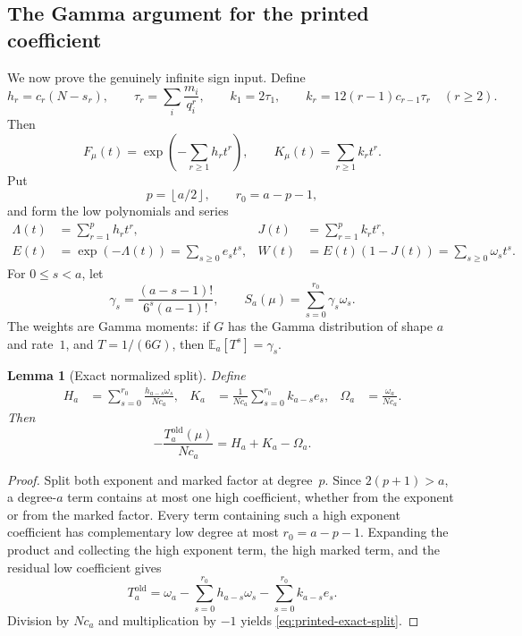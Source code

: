 \documentclass[11pt]{article}
\newtheorem{lemma}[theorem]{Lemma}
\theoremstyle{definition}
\theoremstyle{remark}
\newcommand{\floor}[1]{\left\lfloor #1\right\rfloor}
\begin{document}
\subsection{The Gamma argument for the printed coefficient}
\label{subsec:gamma52}

We now prove the genuinely infinite sign input.  Define
\begin{equation}\label{eq:hk52}
 h_r=c_r(N-s_r),
 \qquad
 \tau_r=\sum_i\frac{m_i}{q_i^r},
 \qquad
 k_1=2\tau_1,
 \qquad
 k_r=12(r-1)c_{r-1}\tau_r\quad(r\ge2).
\end{equation}
Then
\[
 F_\mu(t)=\exp\left(-\sum_{r\ge1}h_rt^r\right),
 \qquad
 K_\mu(t)=\sum_{r\ge1}k_rt^r.
\]
Put
\begin{equation}\label{eq:low-split52}
 p=\floor{a/2},\qquad r_0=a-p-1,
\end{equation}
and form the low polynomials and series
\begin{equation}\label{eq:low-series52}
\begin{aligned}
 \Lambda(t)&=\sum_{r=1}^{p}h_rt^r,
 &J(t)&=\sum_{r=1}^{p}k_rt^r,\\
 E(t)&=\exp(-\Lambda(t))=\sum_{s\ge0}e_st^s,
 &W(t)&=E(t)(1-J(t))=\sum_{s\ge0}\omega_st^s.
\end{aligned}
\end{equation}
For $0\le s<a$, let
\begin{equation}\label{eq:gamma-weight52}
  \gamma_s=\frac{(a-s-1)!}{6^s(a-1)!},
  \qquad
  S_a(\mu)=\sum_{s=0}^{r_0}\gamma_s\omega_s.
\end{equation}
The weights are Gamma moments: if $G$ has the Gamma distribution of shape
$a$ and rate~$1$, and $T=1/(6G)$, then $\mathbb E_a[T^s]=\gamma_s$.

\begin{lemma}[Exact normalized split]\label{lem:printed-exact-split}
Define
\begin{align}
 H_a&=\sum_{s=0}^{r_0}\frac{h_{a-s}\omega_s}{Nc_a},
 &K_a&=\frac1{Nc_a}\sum_{s=0}^{r_0}k_{a-s}e_s,
 &\Omega_a&=\frac{\omega_a}{Nc_a}.
 \label{eq:HKOmega52}
\end{align}
Then
\begin{equation}\label{eq:printed-exact-split}
  -\frac{T_a^{\mathrm{old}}(\mu)}{Nc_a}=H_a+K_a-\Omega_a.
\end{equation}
\end{lemma}

\begin{proof}
Split both exponent and marked factor at degree~$p$.  Since
$2(p+1)>a$, a degree-$a$ term contains at most one high coefficient, whether
from the exponent or from the marked factor.  Every term containing such a
high exponent coefficient has complementary low degree at most
$r_0=a-p-1$.  Expanding the product and collecting the high exponent
term, the high marked term, and the residual low coefficient gives
\[
 T_a^{\mathrm{old}}
 =\omega_a-\sum_{s=0}^{r_0}h_{a-s}\omega_s
              -\sum_{s=0}^{r_0}k_{a-s}e_s.
\]
Division by $Nc_a$ and multiplication by $-1$ yields
\eqref{eq:printed-exact-split}.
\end{proof}
\end{document}
